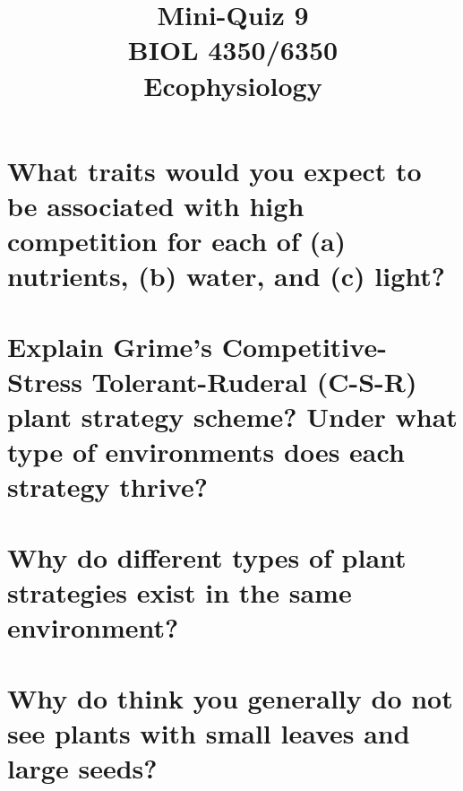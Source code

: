 \documentclass[12pt, notitlepage]{article}   	%
\title{
	\textbf{
		Mini-Quiz 9
	} \\
	\large BIOL 4350/6350 \\
	\large Ecophysiology \\
}
\date{\vspace{-5ex}}
\def\wl{\par \vspace{\baselineskip}}
\begin{document}
{\selectfont %

\maketitle

\section{\small{What traits would you expect to be associated with high competition for each of 
(a) nutrients, (b) water, and (c) light?}}
\wl
\wl
\wl
\wl
\wl
\wl
\wl
\wl
\wl
\wl
\wl
\wl
\wl
\wl

\section{\small{Explain Grime’s Competitive-Stress Tolerant-Ruderal (C-S-R) plant strategy scheme? 
Under what type of environments does each strategy thrive?}}

\newpage

\section{\small{Why do different types of plant strategies exist in the same environment?}}

\wl
\wl
\wl
\wl
\wl
\wl
\wl
\wl
\wl
\wl
\wl
\wl
\wl
\wl

\section{\small{Why do think you generally do not see plants with small leaves and large seeds?}}


} %
\end{document}
